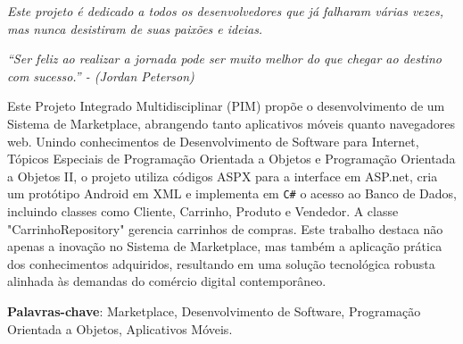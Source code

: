 \documentclass[
	12pt,				%
	openright,			%
	twoside,			%
	a4paper,			%
	english,			%
	brazil				%
	]{abntex2}
\begin{document}
\begin{dedicatoria}
	\vspace*{\fill}
	\centering
	\noindent
	\textit{Este projeto é dedicado a todos os desenvolvedores que já falharam várias vezes, mas nunca desistiram de suas paixões e ideias.}
	\vspace*{\fill}

\end{dedicatoria}

% 
% 


\begin{epigrafe}
	\vspace*{\fill}
	\begin{flushright}
		\textit{``Ser feliz ao realizar a jornada pode ser muito melhor do que chegar ao destino com sucesso.'' - (Jordan Peterson)}
	\end{flushright}
\end{epigrafe}


\setlength{\absparsep}{18pt} %
\begin{resumo}
    Este Projeto Integrado Multidisciplinar (PIM) propõe o desenvolvimento de um Sistema de Marketplace, abrangendo tanto aplicativos móveis quanto navegadores web. Unindo conhecimentos de Desenvolvimento de Software para Internet, Tópicos Especiais de Programação Orientada a Objetos e Programação Orientada a Objetos II, o projeto utiliza códigos ASPX para a interface em ASP.net, cria um protótipo Android em XML e implementa em \texttt{C\#} o acesso ao Banco de Dados, incluindo classes como Cliente, Carrinho, Produto e Vendedor. A classe "CarrinhoRepository" gerencia carrinhos de compras. Este trabalho destaca não apenas a inovação no Sistema de Marketplace, mas também a aplicação prática dos conhecimentos adquiridos, resultando em uma solução tecnológica robusta alinhada às demandas do comércio digital contemporâneo.

 \textbf{Palavras-chave}: Marketplace, Desenvolvimento de Software, Programação Orientada a Objetos, Aplicativos Móveis.
\end{resumo}
\end{document}

